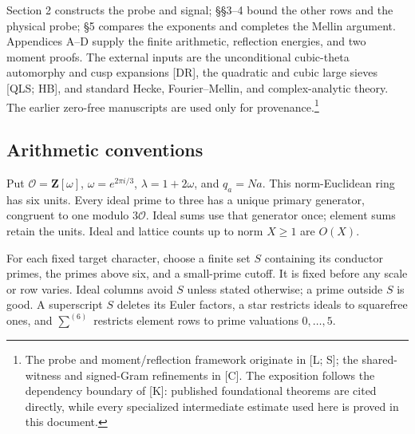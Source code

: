 \documentclass[11pt,a4paper]{article}
\begin{document}
Section 2 constructs the probe and signal; §§3--4 bound the other rows and the physical probe; §5 compares the exponents and completes the Mellin argument. Appendices A--D supply the finite arithmetic, reflection energies, and two moment proofs. The external inputs are the unconditional cubic-theta automorphy and cusp expansions {[}DR{]}, the quadratic and cubic large sieves {[}QLS; HB{]}, and standard Hecke, Fourier--Mellin, and complex-analytic theory. The earlier zero-free manuscripts are used only for provenance.\footnote{The probe and moment/reflection framework originate in {[}L; S{]}; the shared-witness and signed-Gram refinements in {[}C{]}. The exposition follows the dependency boundary of {[}K{]}: published foundational theorems are cited directly, while every specialized intermediate estimate used here is proved in this document.}

\subsection{Arithmetic conventions}\label{sec:1.1}

Put \(\mathcal O=\mathbf Z[\omega]\), \(\omega=e^{2\pi i/3}\), \(\lambda=1+2\omega\), and \(q_a=Na\). This norm-Euclidean ring has six units. Every ideal prime to three has a unique primary generator, congruent to one modulo \(3\mathcal O\). Ideal sums use that generator once; element sums retain the units. Ideal and lattice counts up to norm \(X\ge1\) are \(O(X)\).

For each fixed target character, choose a finite set \(S\) containing its conductor primes, the primes above six, and a small-prime cutoff. It is fixed before any scale or row varies. Ideal columns avoid \(S\) unless stated otherwise; a prime outside \(S\) is good. A superscript \(S\) deletes its Euler factors, a star restricts ideals to squarefree ones, and \(\sum^{(6)}\) restricts element rows to prime valuations \(0,\ldots,5\).
\end{document}
